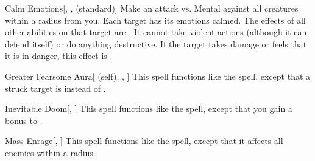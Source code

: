 \lowercase{\hypertarget{spell:Calm Emotions}{}}\label{spell:Calm Emotions}
\begin{apability}[\nth{3}]{\hypertarget{spell:Calm Emotions}{Calm Emotions}}[, ,  (standard)]
Make an attack vs. Mental against all creatures within a \arealarge radius from you.
\hit Each target has its emotions calmed.
The effects of all other  abilities on that target are .
It cannot take violent actions (although it can defend itself) or do anything destructive.
If the target takes damage or feels that it is in danger, this effect is .
\end{apability}
\vspace{0.25em}



\lowercase{\hypertarget{spell:Greater Fearsome Aura}{}}\label{spell:Greater Fearsome Aura}
\begin{attuneability}[\nth{4}]{\hypertarget{spell:Greater Fearsome Aura}{Greater Fearsome Aura}}[ (self), , ]
This spell functions like the  spell, except that a struck target is  instead of .
\end{attuneability}
\vspace{0.25em}



\lowercase{\hypertarget{spell:Inevitable Doom}{}}\label{spell:Inevitable Doom}
\begin{apability}[\nth{4}]{\hypertarget{spell:Inevitable Doom}{Inevitable Doom}}[, ]
This spell functions like the  spell, except that you gain a  bonus to .
\end{apability}
\vspace{0.25em}



\lowercase{\hypertarget{spell:Mass Enrage}{}}\label{spell:Mass Enrage}
\begin{apability}[\nth{4}]{\hypertarget{spell:Mass Enrage}{Mass Enrage}}[, ]
This spell functions like the  spell, except that it affects all enemies within a \areamed radius.
\end{apability}
\vspace{0.25em}




